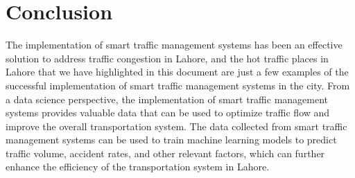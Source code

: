 \documentclass[12pt,a4paper]{article}
\begin{document}
	\section{Conclusion}
	The implementation of smart traffic management systems has been an effective solution to address traffic congestion in Lahore, and the hot traffic places in Lahore that we have highlighted in this document are just a few examples of the successful implementation of smart traffic management systems in the city. From a data science perspective, the implementation of smart traffic management systems provides valuable data that can be used to optimize traffic flow and improve the overall transportation system. The data collected from smart traffic management systems can be used to train machine learning models to predict traffic volume, accident rates, and other relevant factors, which can further enhance the efficiency of the transportation system in Lahore.
	
	
\end{document}
